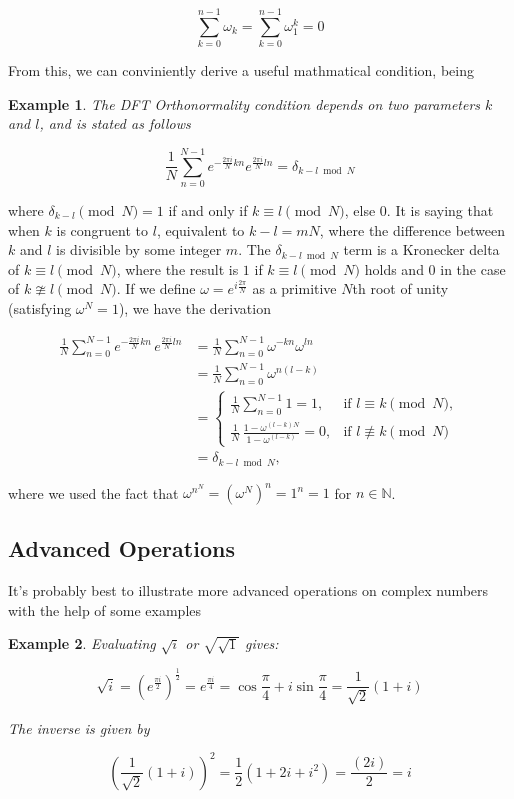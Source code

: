 \documentclass[12pt]{article}
\theoremstyle{plain}
\newtheorem*{example}{Example}
\theoremstyle{definition}
\begin{document}
$$\sum_{k=0}^{n-1} \omega_k = \sum_{k=0}^{n-1} \omega^k_1 = 0$$

From this, we can conviniently derive a useful mathmatical condition, being

\begin{example}
    The DFT Orthonormality condition depends on two parameters $k$ and $l$, and is stated as follows

    $$
    \frac{1}{N} \sum_{n=0}^{N-1}e^{- \frac{2 \pi i}{N}kn} e^{\frac{2 \pi i}{N} ln} = \delta_{k-l \bmod N}
    $$
\end{example}

where $\delta_{k-l} \pmod{N} = 1$ if and only if $k \equiv l \pmod{N}$, else $0$. It is saying that when $k$ is congruent to $l$, equivalent to $k - l = mN$, where the difference between $k$ and $l$ is divisible by some integer $m$. The $\delta_{k-l \bmod N}$ term is a Kronecker delta of $k \equiv l \pmod{N}$, where the result is $1$ if $k \equiv l \pmod{N}$ holds and $0$ in the case of $k \ncong l \pmod{N}$. If we define $\omega = \displaystyle  e^{i \frac{2 \pi}{N}}$ as a primitive $N$th root of unity (satisfying $\omega^N = 1$), we have the derivation

$$
\begin{aligned}
\frac{1}{N}\sum_{n=0}^{N-1} e^{-\frac{2\pi i}{N}kn}\, e^{\frac{2\pi i}{N}ln}
&= \frac{1}{N}\sum_{n=0}^{N-1} \omega^{-kn}\omega^{ln} \\
&= \frac{1}{N}\sum_{n=0}^{N-1} \omega^{n(l-k)} \\
&=
\begin{cases}
\displaystyle \frac{1}{N}\sum_{n=0}^{N-1} 1 = 1, & \text{if } l \equiv k \pmod N,\\
\displaystyle \frac{1}{N}\,\frac{1-\omega^{(l-k)N}}{1-\omega^{(l-k)}} = 0, & \text{if } l \not\equiv k \pmod N
\end{cases}
\\
&= \delta_{k-l \bmod N},
\end{aligned}
$$

where we used the fact that $\omega^{n^N} = \left(\omega^N\right)^n = 1^n = 1$ for $n \in \mathbb{N}$.

\subsection{Advanced Operations}

It's probably best to illustrate more advanced operations on complex numbers with the help of some examples

\begin{example}
    Evaluating $\sqrt{i}$ or $\sqrt{\sqrt{1}}$ gives:

    $$\sqrt{i} = \left(e^{\frac{\pi i}{2}}\right)^{\frac{1}{2}} = e^{\frac{\pi i }{4}} = \cos \frac{\pi}{4} + i \sin \frac{\pi}{4} = \frac{1}{\sqrt{2}} (1 + i)$$

    The inverse is given by

    $$\left(\frac{1}{\sqrt{2}} (1 + i)\right)^2 = \frac{1}{2}(1 + 2i + i^2) = \frac{(2i)}{2} = i$$
\end{example}
\end{document}
